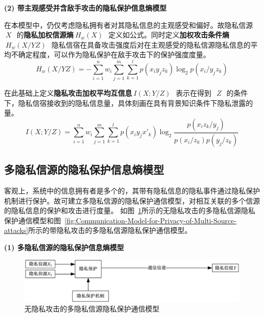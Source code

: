 \textbf{(2) 带主观感受并含敌手攻击的隐私保护信息熵模型}

在本模型中，仍仅考虑隐私拥有者对其隐私信息的主观感受和偏好。故隐私信源~$~X~$~的\textbf{隐私加权信源熵}$~H_{w}(X)~$~定义如公式。同时定义\textbf{加权攻击条件熵}$~H_{w}(X/YZ)~$~隐私信宿在具备攻击强度后对在主观感受的隐私信源隐私信息的平均不确定程度，可以作为隐私保护在敌手攻击下的保护强度度量。
\begin{equation}
H_{w}(X/YZ)=-\sum_{i=1}^{n}w_{i}\sum_{j=1}^{m}\sum_{k=1}^{l}p(x_{i}y_{j}z_{k})\log_{2}p(x_{i}/y_{j}z_{k})
\end{equation}

在此基础上定义\textbf{隐私攻击加权平均互信息}$~I(X;Y/Z)~$~表示在得到~$~Z~$~的条件下，隐私信宿接收到的隐私信息量，具体刻画在具有背景知识条件下隐私泄露的量。
\begin{equation}
I(X;Y/Z)=\sum_{i=1}^{n}w_{i}\sum_{j=1}^{m}\sum_{k=1}^{l}p(x_{i}y_{j}{x}'_{k})\log_{2}\frac{p(x_{i}z_{k}/y_{j})}{p(x_{i}/z_{k})p(y_{j}/z_{k})}
\end{equation}

\subsection{多隐私信源的隐私保护信息熵模型}

客观上，系统中的信息拥有者是多个的，其带有隐私信息的隐私事件通过隐私保护机制进行保护。故可建立多隐私信源的隐私保护通信模型，对相互关联的多个信源的隐私信息的保护和攻击进行度量。 如图~\ref{fig:Communication-Model-for-Privacy-of-Multi-Source}所示的无隐私攻击的多隐私信源隐私保护通信模型和图~\ref{fig:Communication-Model-for-Privacy-of-Multi-Source-attacks}所示的带隐私攻击的多隐私信源隐私保护通信模型。

\textbf{(1) 多隐私信源的隐私保护信息熵模型}

\begin{figure}[htbp]
	\centering
	\includegraphics[width = 0.95\linewidth]{./figures/Communication-Model-for-Privacy-of-Multi-Source.png}
	\caption{无隐私攻击的多隐私信源隐私保护通信模型}
	\label{fig:Communication-Model-for-Privacy-of-Multi-Source}
\end{figure}

